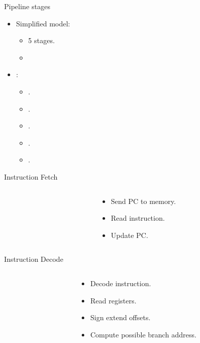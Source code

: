 \begin{frame}[t]{Pipeline stages}
\begin{itemize}
  \item Simplified model:
    \begin{itemize}
      \item 5 stages.
      \item {}
    \end{itemize}
  \item {}:
    \begin{itemize}
      \item {}.
      \item {}.
      \item {}.
      \item {}.
      \item {}.
    \end{itemize}
\end{itemize}
\end{frame}

\begin{frame}[t]{Instruction Fetch}
\begin{columns}
\begin{column}{.5\textwidth}

\end{column}
\begin{column}{.5\textwidth}
\begin{itemize}
  \item Send PC to memory.
  \item Read instruction.
  \item Update PC.
\end{itemize}
\end{column}
\end{columns}
\end{frame}

\begin{frame}[t]{Instruction Decode}
\begin{columns}
\begin{column}{.5\textwidth}

\end{column}
\begin{column}{.5\textwidth}
\begin{itemize}
  \item Decode instruction.
  \item Read registers.
  \item Sign extend offsets.
  \item Compute possible branch address.
\end{itemize}
\end{column}
\end{columns}
\end{frame}

